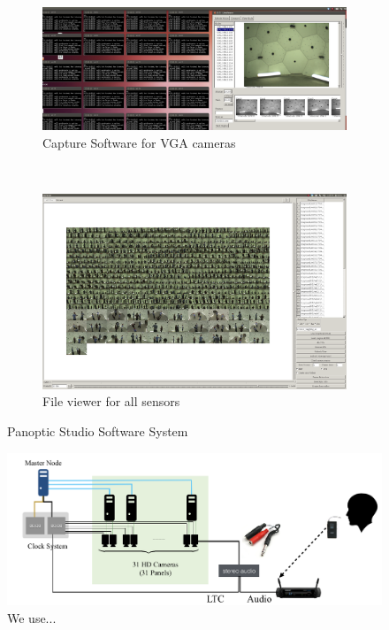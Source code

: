 \begin{figure}[t]
	\begin{subfigure}{\textwidth}
		\includegraphics[width=\linewidth]{fig_system/dome_sw_capture.png}
		\caption{Capture Software for VGA cameras}
	\end{subfigure}\vspace{0.5cm}\\
	\begin{subfigure}{\textwidth}
		\includegraphics[width=\textwidth]{fig_system/dome_sw_viewer.png}
		\caption{File viewer for all sensors}
	\end{subfigure}
	\caption{Panoptic Studio Software System}
\end{figure}



\begin{figure}[t]
	\includegraphics[width=\linewidth]{fig_system/dome_mic}
	\caption{We use...}
\end{figure}

